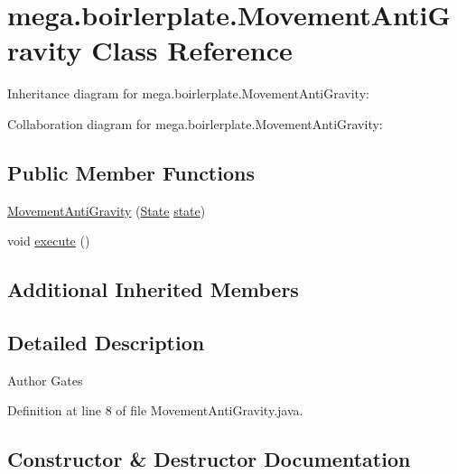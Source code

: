 \hypertarget{classmega_1_1boirlerplate_1_1_movement_anti_gravity}{}\section{mega.\+boirlerplate.\+Movement\+Anti\+Gravity Class Reference}
\label{classmega_1_1boirlerplate_1_1_movement_anti_gravity}


Inheritance diagram for mega.\+boirlerplate.\+Movement\+Anti\+Gravity\+:


Collaboration diagram for mega.\+boirlerplate.\+Movement\+Anti\+Gravity\+:
\subsection*{Public Member Functions}
\begin{DoxyCompactItemize}
\item 
\hyperlink{classmega_1_1boirlerplate_1_1_movement_anti_gravity_a8916e2f2ed834cb32112b11369252fad}{Movement\+Anti\+Gravity} (\hyperlink{classmega_1_1boirlerplate_1_1_state}{State} \hyperlink{classmega_1_1boirlerplate_1_1_component_a87b0d70f323b5fee60a200e07c9c20fd}{state})
\item 
void \hyperlink{classmega_1_1boirlerplate_1_1_movement_anti_gravity_af628cd2124407f6009e33108000f759d}{execute} ()
\end{DoxyCompactItemize}
\subsection*{Additional Inherited Members}


\subsection{Detailed Description}
\begin{DoxyAuthor}{Author}
Gates 
\end{DoxyAuthor}


Definition at line 8 of file Movement\+Anti\+Gravity.\+java.



\subsection{Constructor \& Destructor Documentation}
\mbox{\label{classmega_1_1boirlerplate_1_1_movement_anti_gravity_a8916e2f2ed834cb32112b11369252fad}} 
